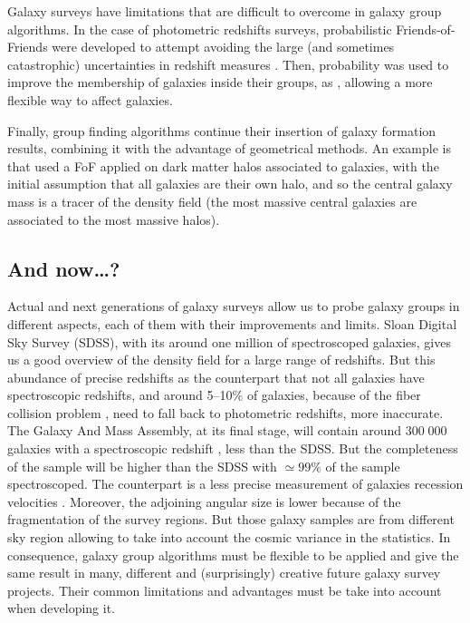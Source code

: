 Galaxy surveys have limitations that are difficult to overcome in galaxy group
algorithms. In the case of photometric redshifts surveys, probabilistic
Friends-of-Friends were developed to attempt avoiding the large (and sometimes
catastrophic) uncertainties in redshift measures \citep{Liu+08}. Then,
probability was used to improve the membership of galaxies inside their groups,
as \citet{DominguezRomero+12}, allowing a more flexible way to affect galaxies.

Finally, group finding algorithms continue their insertion of galaxy formation
results, combining it with the advantage of geometrical methods. An example is
\citet{MunozCuartas+12} that used a FoF applied on dark matter halos associated
to galaxies, with the initial assumption that all galaxies are their own halo,
and so the central galaxy mass is a tracer of the density field (the most
massive central galaxies are associated to the most massive halos).

\subsection{And now\ldots?}
\label{sub:and_now}

Actual and next generations of galaxy surveys allow us to probe galaxy groups
in different aspects, each of them with their improvements and limits. Sloan
Digital Sky Survey (SDSS), with its around one million of spectroscoped
galaxies, gives us a good overview of the density field for a large range of
redshifts. But this abundance of precise redshifts as the counterpart that not
all galaxies have spectroscopic redshifts, and around 5--10\% of galaxies,
because of the fiber collision problem \citep{Blanton+03}, need to fall back to
photometric redshifts, more inaccurate. The Galaxy And Mass Assembly, at its
final stage, will contain around $300\;000$ galaxies with a spectroscopic
redshift \citep{Hopkins+13}, less than the SDSS\@. But the completeness of the
sample will be higher than the SDSS with $\simeq99\%$ of the sample
spectroscoped. The counterpart is a less precise measurement of galaxies
recession velocities \citep{Robotham+11,Hopkins+13}. Moreover, the adjoining
angular size is lower because of the fragmentation of the survey regions. But
those galaxy samples are from different sky region allowing to take into
account the cosmic variance in the statistics. In consequence, galaxy group
algorithms must be flexible to be applied and give the same result in many,
different and (surprisingly) creative future galaxy survey projects. Their
common limitations and advantages must be take into account when developing it.

